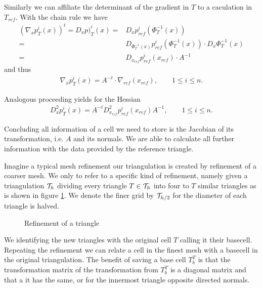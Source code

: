 \begin{example}
Similarly we can affiliate the determinant of the gradient in $T$ to a caculation in $T_{ref}$. With the chain rule we have
\begin{align*}
	\left(\nabla_x p_T^i(x)\right)^t = D_x p)_T^i(x) =& D_x p^i_{ref}(\Phi_T^{-1}(x)) \\
	  =& D_{\Phi_T^{-1}(x)}p^i_{ref}(\Phi_T^{-1}(x)) \cdot D_x  \Phi_T^{-1}(x) \\
	  =& D_{x_{ref}}p^i_{ref}(x_{ref}) \cdot  A^{-1}
\end{align*}
and thus
\begin{align}
	\nabla_x p_T^i(x) = A^{-t} \cdot \nabla_{ref}(x_{ref}), \qquad 1 \leq i \leq n.
\end{align}

Analogous proceeding yields for the Hessian
\begin{align}
D_x^2p_T^i(x) = A^{-t} D_{x_{ref}}^2p^i_{ref}(x_{ref})  A^{-1}, \qquad 1 \leq i \leq n.
\end{align}

Concluding all information of a cell we need to store is the Jacobian of its transformation, i.e. $A$ and its normals. We are able to calculate all further information with the data provided by the reference triangle.
\end{example}

Imagine a typical mesh refinement our triangulation is created by refinement of a coarser mesh. We only to refer to a specific kind of refinement, namely given a triangulation $\mathcal{T}_h$ dividing every triangle $T \in \mathcal{T}_h$ into four to $T$ similar triangles as is shown in figure \ref{pic: refinement}. We denote the finer grid by $\mathcal{T}_{h/2}$ for the diameter of each triangle is halved.

\begin{figure}[h]

\caption{Refinement of a triangle}
 \label{pic: refinement}
\end{figure}

We identifying the new triangles with the original cell $T$ calling it their basecell. Repeating the refinement we can relate a cell in the finest mesh with a basecell in the original triangulation.
The benefit of saving a base cell $T^T_b$ is that the transformation matrix of the transformation from $T^T_b$ is a diagonal matrix and that a it has the same, or for the innermost triangle opposite directed normals.

